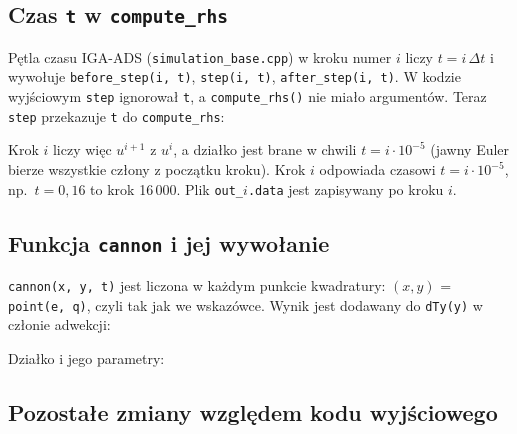 \documentclass[11pt,a4paper]{article}
\newcommand{\kod}[3]{}
\begin{document}
\subsection{Czas \texttt{t} w \texttt{compute\_rhs}}

Pętla czasu IGA-ADS (\texttt{simulation\_base.cpp}) w kroku numer $i$ liczy
$t = i\,\Delta t$ i wywołuje \texttt{before\_step(i, t)}, \texttt{step(i, t)}, \texttt{after\_step(i, t)}.
W kodzie wyjściowym \texttt{step} ignorował \texttt{t}, a \texttt{compute\_rhs()} nie miało argumentów.
Teraz \texttt{step} przekazuje \texttt{t} do \texttt{compute\_rhs}:
\kod{pollution.hpp}{88}{91}
Krok $i$ liczy więc $u^{i+1}$ z $u^{i}$, a działko jest brane w chwili $t = i \cdot 10^{-5}$
(jawny Euler bierze wszystkie człony z początku kroku). Krok $i$ odpowiada czasowi
$t = i\cdot 10^{-5}$, np.\ $t = 0{,}16$ to krok 16\,000.
Plik \texttt{out\_$i$.data} jest zapisywany po kroku $i$.

\subsection{Funkcja \texttt{cannon} i jej wywołanie}

\texttt{cannon(x, y, t)} jest liczona w każdym punkcie kwadratury:
$(x, y)$ = \texttt{point(e, q)}, czyli tak jak we wskazówce.
Wynik jest dodawany do \texttt{dTy(y)} w członie adwekcji:
\kod{pollution.hpp}{135}{159}

Działko i jego parametry:
\kod{pollution.hpp}{111}{133}
\kod{pollution.hpp}{24}{41}

\subsection{Pozostałe zmiany względem kodu wyjściowego}
\end{document}

